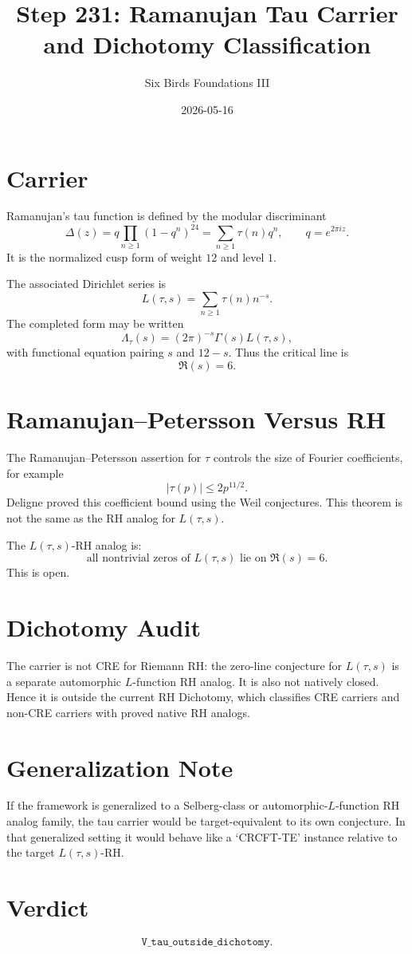 \documentclass{article}
\title{Step 231: Ramanujan Tau Carrier and Dichotomy Classification}
\author{Six Birds Foundations III}
\date{2026-05-16}
\begin{document}
\maketitle

\section{Carrier}

Ramanujan's tau function is defined by the modular discriminant
\[
  \Delta(z)=q\prod_{n\ge 1}(1-q^n)^{24}
  =\sum_{n\ge 1}\tau(n)q^n,
  \qquad q=e^{2\pi iz}.
\]
It is the normalized cusp form of weight \(12\) and level \(1\).

The associated Dirichlet series is
\[
  L(\tau,s)=\sum_{n\ge 1}\tau(n)n^{-s}.
\]
The completed form may be written
\[
  \Lambda_\tau(s)=(2\pi)^{-s}\Gamma(s)L(\tau,s),
\]
with functional equation pairing \(s\) and \(12-s\). Thus the critical line is
\[
  \Re(s)=6.
\]

\section{Ramanujan--Petersson Versus RH}

The Ramanujan--Petersson assertion for \(\tau\) controls the size of Fourier coefficients, for example
\[
  |\tau(p)|\le 2p^{11/2}.
\]
Deligne proved this coefficient bound using the Weil conjectures. This theorem is not the same as the RH analog for \(L(\tau,s)\).

The \(L(\tau,s)\)-RH analog is:
\[
  \text{all nontrivial zeros of }L(\tau,s)\text{ lie on }\Re(s)=6.
\]
This is open.

\section{Dichotomy Audit}

The carrier is not CRE for Riemann RH: the zero-line conjecture for \(L(\tau,s)\) is a separate automorphic \(L\)-function RH analog. It is also not natively closed. Hence it is outside the current RH Dichotomy, which classifies CRE carriers and non-CRE carriers with proved native RH analogs.

\section{Generalization Note}

If the framework is generalized to a Selberg-class or automorphic-\(L\)-function RH analog family, the tau carrier would be target-equivalent to its own conjecture. In that generalized setting it would behave like a `CRCFT-TE' instance relative to the target \(L(\tau,s)\)-RH.

\section{Verdict}

\[
  \boxed{\texttt{V\_tau\_outside\_dichotomy}.}
\]
\end{document}
